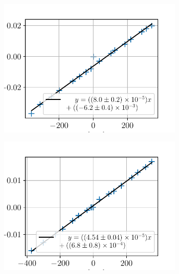 \begin{figure}{}
    \centering
    \begin{subfigure}{0.3\textwidth}
        \includegraphics[width=\linewidth]{figures/Ag_B.pdf}
        \caption{}
        \label{fig:Ag_B}
    \end{subfigure}%
    \begin{subfigure}{0.3\textwidth}
        \includegraphics[width=\linewidth]{figures/Cu_B.pdf}
        \caption{}
        \label{fig:Cu_B}
    \end{subfigure}%
    \begin{subfigure}{0.3\textwidth}

\end{subfigure}
\end{figure}
